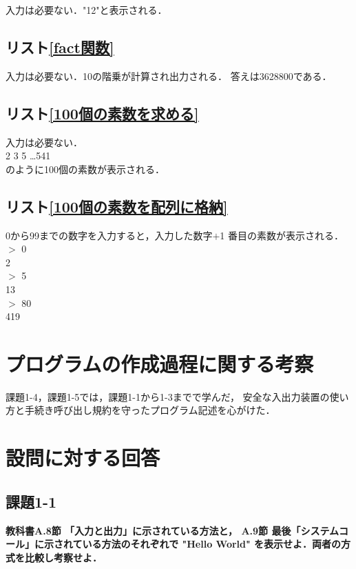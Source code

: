 \documentclass[11pt]{jarticle}
\begin{document}
入力は必要ない．"12"と表示される．

\subsection{リスト\ref{fact関数}}

入力は必要ない．10の階乗が計算され出力される．
答えは3628800である．

\subsection{リスト\ref{100個の素数を求める}}

入力は必要ない．\\
2 3 5 \dots 541\\
のように100個の素数が表示される．

\subsection{リスト\ref{100個の素数を配列に格納}}

0から99までの数字を入力すると，入力した数字$+$1 番目の素数が表示される．\\
$>$ 0\\
2\\
$>$ 5\\
13\\
$>$ 80\\
419\\

\section{プログラムの作成過程に関する考察}

課題1-4，課題1-5では，課題1-1から1-3までで学んだ，
安全な入出力装置の使い方と手続き呼び出し規約を守ったプログラム記述を心がけた．

\section{設問に対する回答}

\subsection{課題1-1}

\textbf{教科書A.8節 「入力と出力」に示されている方法と， A.9節 最後「システムコール」に示されている方法のそれぞれで "Hello World" を表示せよ．両者の方式を比較し考察せよ．}\\
\end{document}
